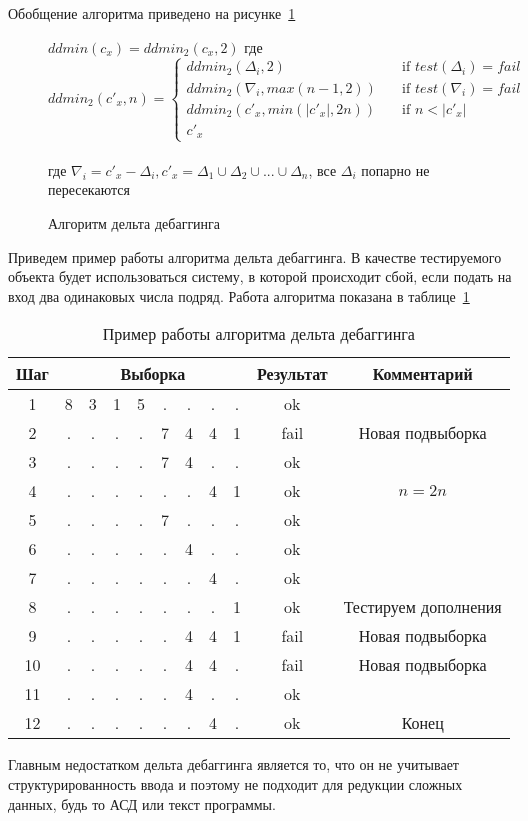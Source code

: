 Обобщение алгоритма приведено на рисунке~\ref{ddminalg}
\begin{figure}
	$ddmin(c_x) = ddmin_2(c_x, 2)$ где \\
\[ ddmin_2(c'_x, n) =
  \begin{cases}
    ddmin_2(\Delta_i, 2)       & \quad \text{if } test(\Delta_i) = fail\\
    ddmin_2(\nabla_i, max(n - 1, 2))       & \quad \text{if } test(\nabla_i) = fail\\
    ddmin_2(c'_x, min(|c'_x|, 2n))       & \quad \text{if } n < |c'_x|\\
    c'_x
  \end{cases}
\]
\\
где $\nabla_i = c'_x - \Delta_i, c'_x = \Delta_1 \cup \Delta_2 \cup ... \cup \Delta_n$, все $\Delta_i$ попарно не пересекаются
\caption{Алгоритм дельта дебаггинга}
\label{ddminalg}
\end{figure}
Приведем пример работы алгоритма дельта дебаггинга. В качестве тестируемого объекта будет использоваться систему, в которой происходит сбой, если подать на вход два одинаковых числа подряд. Работа алгоритма показана в таблице~\ref{tab:ddminex2}
\begin{table}[]
\center
\caption{\label{tab:ddminex2}Пример работы алгоритма дельта дебаггинга}
\begin{tabular}{| c | *{8}{c} | c | c |}
\hline
\bf Шаг & \multicolumn{8}{|c|}{\bf Выборка} & {\bf Результат} & {\bf Комментарий}\\
\hline
1 &  8 & 3 & 1 & 5 & . & . & . & .  & ok & \\
\hline
2 &  . & . & . & . & 7 & 4 & 4 & 1 & fail & Новая подвыборка\\
\hline
3 &  . & . & . & . & 7 & 4 & . & . & ok & \\
\hline
4 &  . & . & . & . & . & . & 4 & 1 & ok & $n = 2n$\\
\hline
5 &  . & . & . & . & 7 & . & . & . & ok & \\
\hline
6 &  . & . & . & . & . & 4 & . & . & ok &\\
\hline
7 &  . & . & . & . & . & . & 4 & . & ok &\\
\hline
8 &  . & . & . & . & . & . & . & 1 & ok &Тестируем дополнения\\
\hline
9 &  . & . & . & . & . & 4 & 4 & 1 & fail &Новая подвыборка\\
\hline
10 &  . & . & . & . & . & 4 & 4 & . & fail &Новая подвыборка\\
\hline
11 &  . & . & . & . & . & 4 & . & . & ok &\\
\hline
12 &  . & . & . & . & . & . & 4 & . & ok & Конец\\
\hline
\end{tabular}
\end{table}
Главным недостатком дельта дебаггинга является то, что он не учитывает структурированность ввода и поэтому не подходит для редукции сложных данных, будь то АСД или текст программы.

